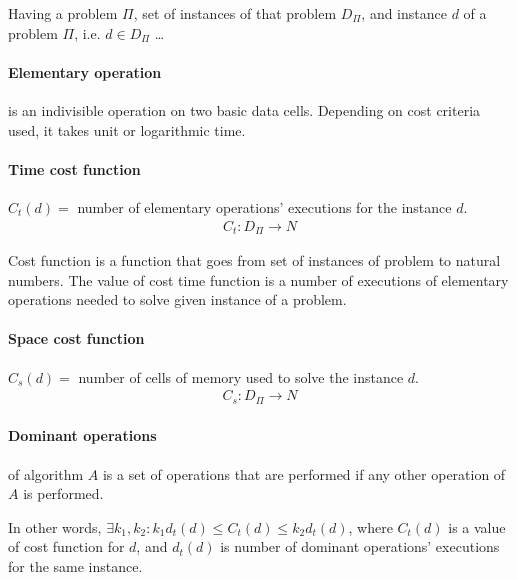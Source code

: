 \documentclass{article}
\newcommand{\separator}{\noindent \line(1,0){529}}
\begin{document}
Having a problem $\Pi$, set of instances of that problem $D_\Pi$, and instance $d$ of a problem
$\Pi$, i.e. $d \in D_\Pi$ \ldots

\begin{multicols}{2}

\paragraph{Elementary operation}
is an indivisible operation on two basic data cells. Depending on cost criteria used, it takes unit
or logarithmic time.




\paragraph{Time cost function}
$C_t(d) = $ number of elementary operations' executions for the instance $d$.
\begin{gather*}
C_t : D_\Pi \rightarrow N
\end{gather*}

Cost function is a function that goes from set of instances of problem to natural numbers. The value
of cost time function is a number of executions of elementary operations needed to solve given
instance of a problem.

\paragraph{Space cost function}
$C_s(d) = $ number of cells of memory used to solve the instance $d$.
\begin{gather*}
C_s : D_\Pi \rightarrow N
\end{gather*}

\paragraph{Dominant operations}
of algorithm $A$ is a set of operations that are performed 
if any other operation of $A$ is performed.

In other words, $\exists k_1, k_2: k_1 d_t(d) \leq C_t(d) \leq k_2 d_t(d)$, where $C_t(d)$ is a
value of cost function for $d$, and $d_t(d)$ is number of dominant operations' executions for the
same instance.

\end{multicols}
\end{document}
